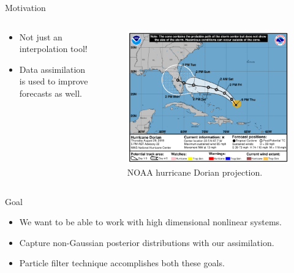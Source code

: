 \documentclass[aspectratio=169]{beamer}
\begin{document}
\begin{frame}{Motivation}
\vfill
    \begin{columns}
    \begin{column}{.49\textwidth}
    \begin{itemize}
        \item Not just an interpolation tool!
        \item Data assimilation is used to improve forecasts as well.
    \end{itemize}
    \end{column}

 \begin{column}{.49\textwidth}
        \begin{figure}[h]
            \centering
            \vspace*{-2cm}
            \includegraphics[width=\columnwidth]{figures/hurricane_prediction.png}
            \caption{NOAA hurricane Dorian projection.}
        \end{figure}
 \end{column}
\end{columns}
\vfill 
\end{frame}


\begin{frame}{Goal}
\vfill
\begin{itemize}
    \pause
    \item We want to be able to work with high dimensional nonlinear systems.
    \pause
    \item Capture non-Gaussian posterior distributions with our assimilation.
    \pause
    \item Particle filter technique accomplishes both these goals.
\end{itemize}
\vfill
\end{frame}
\end{document}
